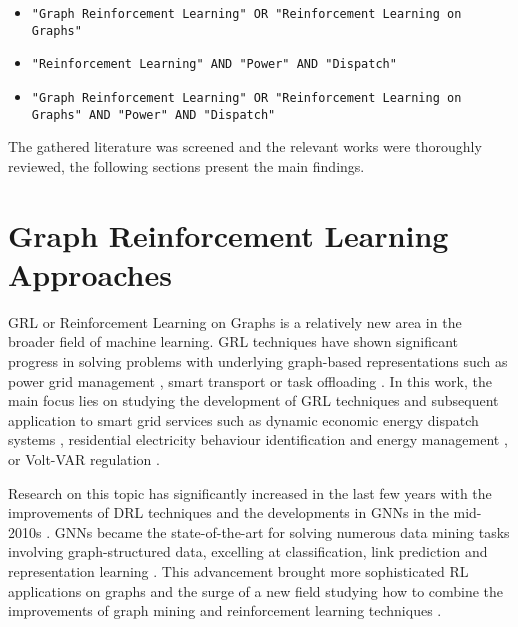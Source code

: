 \begin{itemize}
	\item \texttt{"Graph Reinforcement Learning" OR "Reinforcement Learning on Graphs"}
	\item \texttt{"Reinforcement Learning" AND "Power" AND "Dispatch"}
	\item \texttt{"Graph Reinforcement Learning" OR "Reinforcement Learning on Graphs" AND "Power" AND "Dispatch"}
\end{itemize}

 The gathered literature was screened and the relevant works were thoroughly reviewed, the following sections present the main findings.


\begin{comment}
	* Add literature histogram chart
\end{comment}



\section{Graph Reinforcement Learning Approaches}

\ac{GRL} or Reinforcement Learning on Graphs is a relatively new area in the broader field of machine learning. \ac{GRL} techniques have shown significant progress in solving problems with underlying graph-based representations such as power grid management \cite{liNovelGraphReinforcement2022, chenGraphRepresentationLearningbased2023}, smart transport \cite{xingBilevelGraphReinforcement2023, almasanDeepReinforcementLearning2022} or task offloading \cite{gaoFastAdaptiveTask2023, liGraphReinforcementLearningbased2022}. In this work, the main focus lies on studying the development of \ac{GRL} techniques and subsequent application to smart grid services such as dynamic economic energy dispatch systems \cite{chenScalableGraphReinforcement2023, xingRealtimeOptimalScheduling2023}, residential electricity behaviour identification and energy management \cite{chenGraphRepresentationLearningbased2023}, or Volt-VAR regulation \cite{huMultiagentGraphReinforcement2024}.  \par
Research on this topic has significantly increased in the last few years with the improvements of \ac{DRL} techniques and the developments in \acp{GNN} in the mid-2010s \cite{kipfSemiSupervisedClassificationGraph2017, velickovicGraphAttentionNetworks2018, liGatedGraphSequence2016, gaoGraphUNets2019}. \acp{GNN} became the state-of-the-art for solving numerous data mining tasks involving graph-structured data, excelling at classification, link prediction and representation learning \cite{xuHowPowerfulAre2019, nieReinforcementLearningGraphs2023}. This advancement brought more sophisticated \ac{RL} applications on graphs and the surge of a new field studying how to combine the improvements of graph mining and reinforcement learning techniques \cite{vesselinovaLearningCombinatorialOptimization2020, nieReinforcementLearningGraphs2023}. \par

